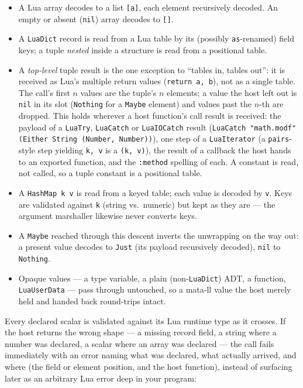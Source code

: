 \documentclass[11pt,a4paper]{article}
\begin{document}
\begin{itemize}
  \item A Lua array decodes to a list \texttt{[a]}, each element
    recursively decoded.  An empty or absent (\texttt{nil}) array
    decodes to \texttt{[]}.
  \item A \texttt{LuaDict} record is read from a Lua table by its
    (possibly \texttt{as}-renamed) field keys; a tuple \emph{nested}
    inside a structure is read from a positional table.
  \item A \emph{top-level} tuple result is the one exception to
    ``tables in, tables out'': it is received as Lua's multiple return
    values (\texttt{return a, b}), not as a single table.  The call's
    first $n$ values are the tuple's $n$ elements; a value the host left
    out is \texttt{nil} in its slot (\texttt{Nothing} for a
    \texttt{Maybe} element) and values past the $n$-th are dropped.
    This holds wherever a host function's call result is received: the
    payload of a \texttt{LuaTry}, \texttt{LuaCatch} or
    \texttt{LuaIOCatch} result (\texttt{LuaCatch "math.modf" (Either
    String (Number, Number))}), one step of a \texttt{LuaIterator}
    (a \texttt{pairs}-style step yielding \texttt{k, v} is a
    \texttt{(k, v)}), the result of a callback the host hands to an
    exported function, and the \texttt{:method} spelling of each.  A
    constant is read, not called, so a tuple constant is a positional
    table.
  \item A \texttt{HashMap k v} is read from a keyed table; each value
    is decoded by \texttt{v}.  Keys are validated against \texttt{k}
    (string vs.\ numeric) but kept as they are --- the argument
    marshaller likewise never converts keys.
  \item A \texttt{Maybe} reached through this descent inverts the
    unwrapping on the way out: a present value decodes to \texttt{Just}
    (its payload recursively decoded), \texttt{nil} to \texttt{Nothing}.
  \item Opaque values --- a type variable, a plain
    (non-\texttt{LuaDict}) ADT, a function, \texttt{LuaUserData} --- pass
    through untouched, so a mata-ll value the host merely held and
    handed back round-trips intact.
\end{itemize}

Every declared scalar is validated against its Lua runtime type as it
crosses.  If the host returns the wrong shape --- a missing record
field, a string where a number was declared, a scalar where an array
was declared --- the call fails immediately with an error naming what
was declared, what actually arrived, and where (the field or element
position, and the host function), instead of surfacing later as an
arbitrary Lua error deep in your program:
\end{document}
